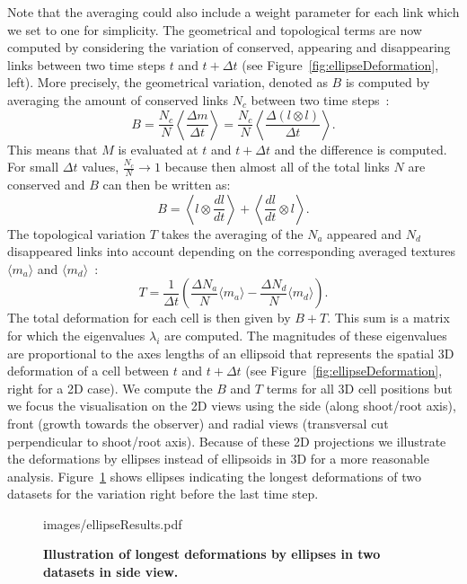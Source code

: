 \documentclass[11pt,a4paper, final]{article}
\begin{document}
\noindent
Note that the averaging could also include a weight parameter for each link which we set to one for simplicity. The geometrical and topological terms are now computed by considering the variation of conserved, appearing and disappearing links between two time steps $t$ and $t + \Delta t$ (see Figure~\ref{fig:ellipseDeformation}, left). More precisely, the geometrical variation, denoted as $B$ is computed by averaging the amount of conserved links $N_c$ between two time steps~\cite{graner_et_al_2008}:
\begin{equation}
B = \frac{N_c}{N} \left\langle \frac{\Delta m}{\Delta t} \right\rangle = \frac{N_c}{N} \left\langle \frac{\Delta (l \otimes l) }{\Delta t} \right\rangle.
\end{equation}
This means that $M$ is evaluated at $t$ and $t + \Delta t$ and the difference is computed. For small $\Delta t$ values, $\frac{N_c}{N} \rightarrow 1$ because then almost all of the total links $N$ are conserved and $B$ can then be written as:
\begin{equation}
B = \left\langle l \otimes \frac{dl}{dt} \right\rangle + \left\langle \frac{dl}{dt} \otimes l \right\rangle.
\end{equation}
The topological variation $T$ takes the averaging of the $N_a$ appeared and $N_d$ disappeared links into account depending on the corresponding averaged textures $\langle m_a \rangle$ and $\langle m_d \rangle$~\cite{graner_et_al_2008}:
\begin{equation}
T = \frac{1}{\Delta t} \left( \frac{\Delta N_a}{N} \langle m_a \rangle - \frac{\Delta N_d}{N}  \langle m_d \rangle \right).
\end{equation}
The total deformation for each cell is then given by $B+T$. This sum is a matrix for which the eigenvalues $\lambda_i$ are computed. The magnitudes of these eigenvalues are proportional to the axes lengths of an ellipsoid that represents the spatial 3D deformation of a cell between $t$ and $t + \Delta t$ (see Figure~\ref{fig:ellipseDeformation}, right for a 2D case). We compute the $B$ and $T$ terms for all 3D cell positions but we focus the visualisation on the 2D views using the side (along shoot/root axis), front (growth towards the observer) and radial views (transversal cut perpendicular to shoot/root axis). Because of these 2D projections we illustrate the deformations by ellipses instead of ellipsoids in 3D for a more reasonable analysis. Figure~\ref{fig:ellipseResults} shows ellipses indicating the longest deformations of two datasets for the variation right before the last time step.
%
\begin{figure}[htbp]
	\begin{center}
		\begin{overpic}[width=1.\linewidth]{images/ellipseResults.pdf}
		\end{overpic}
\caption[Illustration of longest deformations by ellipses in two datasets in side view.]
{
{\bf Illustration of longest deformations by ellipses in two datasets in side view.}
}
	\label{fig:ellipseResults}
	\end{center}
\end{figure}
%
\end{document}
